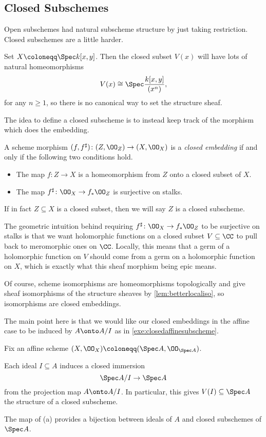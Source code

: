 \documentclass[../notes.tex]{subfiles}
\begin{document}
\subsection{Closed Subschemes}
Open subschemes had natural subscheme structure by just taking restriction. Closed subschemes are a little harder.
\begin{example}
	Set $X\coloneqq\Spec k[x,y]$. Then the closed subset $V(x)$ will have lots of natural homeomorphisms
	\[V(x)\cong\Spec\frac{k[x,y]}{(x^n)},\]
	for any $n\ge1$, so there is no canonical way to set the structure sheaf.
\end{example}
The idea to define a closed subscheme is to instead keep track of the morphism which does the embedding.
\begin{definition}
	A scheme morphism $(f,f^\sharp)\colon(Z,\OO_Z)\to(X,\OO_X)$ is a \textit{closed embedding} if and only if the following two conditions hold.
	\begin{itemize}
		\item The map $f\colon Z\to X$ is a homeomorphism from $Z$ onto a closed subset of $X$.
		\item The map $f^\sharp\colon\OO_X\to f_*\OO_Z$ is surjective on stalks.
	\end{itemize}
	If in fact $Z\subseteq X$ is a closed subset, then we will say $Z$ is a closed subscheme.
\end{definition}
\begin{remark}
	The geometric intuition behind requiring $f^\sharp\colon\OO_X\to f_*\OO_Z$ to be surjective on stalks is that we want holomorphic functions on a closed subset $V\subseteq\CC$ to pull back to meromorphic ones on $\CC$. Locally, this means that a germ of a holomorphic function on $V$ should come from a germ on a holomorphic function on $X$, which is exactly what this sheaf morphism being epic means.
\end{remark}
\begin{example} \label{ex:iso-is-closed}
	Of course, scheme isomorphisms are homeomorphisms topologically and give sheaf isomorphisms of the structure sheaves by \autoref{lem:betterlocaliso}, so isomorphisms are closed embeddings.
\end{example}
The main point here is that we would like our closed embeddings in the affine case to be induced by $A\onto A/I$ as in \autoref{exe:closedaffinesubscheme}.
\begin{proposition} \label{prop:affineclosedsubschemes}
	Fix an affine scheme $(X,\OO_X)\coloneqq(\Spec A,\OO_{\Spec A})$.
	\begin{listalph}
		\item Each ideal $I\subseteq A$ induces a closed immersion
		\[\Spec A/I\to\Spec A\]
		from the projection map $A\onto A/I$. In particular, this gives $V(I)\subseteq\Spec A$ the structure of a closed subscheme.
		\item The map of (a) provides a bijection between ideals of $A$ and closed subschemes of $\Spec A$.
	\end{listalph}
\end{proposition}
\end{document}
